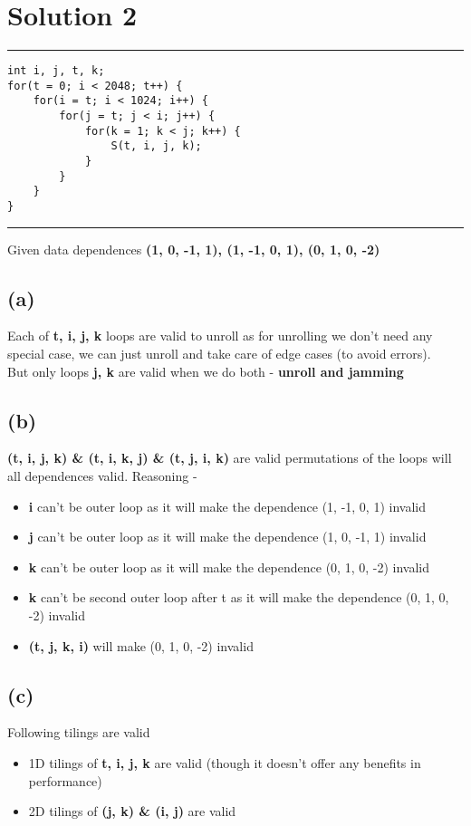 \documentclass[a4paper]{article}
\begin{document}
\newpage
\section{Solution 2}

\hrule
\begin{lstlisting}
int i, j, t, k;
for(t = 0; i < 2048; t++) {
    for(i = t; i < 1024; i++) {
        for(j = t; j < i; j++) {
            for(k = 1; k < j; k++) {
                S(t, i, j, k);
            }
        }
    }
}
\end{lstlisting}
\hrule 
\vspace{0.5cm}
Given data dependences {\bf (1, 0, -1, 1), (1, -1, 0, 1), (0, 1, 0, -2)}
\newline
\subsection{(a)} Each of {\bf t, i, j, k} loops are valid to unroll as for unrolling we don't need any special case, we can just unroll and take care of edge cases (to avoid errors). \\
But only loops {\bf j, k} are valid when we do both - {\bf unroll and jamming}

\subsection{(b)} {\bf (t, i, j, k) \& (t, i, k, j) \& (t, j, i, k)} are valid permutations of the loops will all dependences valid. Reasoning - 
\begin{itemize}
\item {\bf i} can't be outer loop as it will make the dependence (1, -1, 0, 1) invalid
\item {\bf j} can't be outer loop as it will make the dependence (1, 0, -1, 1) invalid
\item {\bf k} can't be outer loop as it will make the dependence (0, 1, 0, -2) invalid
\item {\bf k} can't be second outer loop after t as it will make the dependence (0, 1, 0, -2) invalid
\item{\bf (t, j, k, i)} will make (0, 1, 0, -2) invalid
\end{itemize}

\subsection{(c)} Following tilings are valid
\begin{itemize}
\item 1D tilings of {\bf t, i, j, k} are valid (though it doesn't offer any benefits in performance)
\item 2D tilings of {\bf (j, k) \& (i, j)} are valid
\end{itemize}
\end{document}
